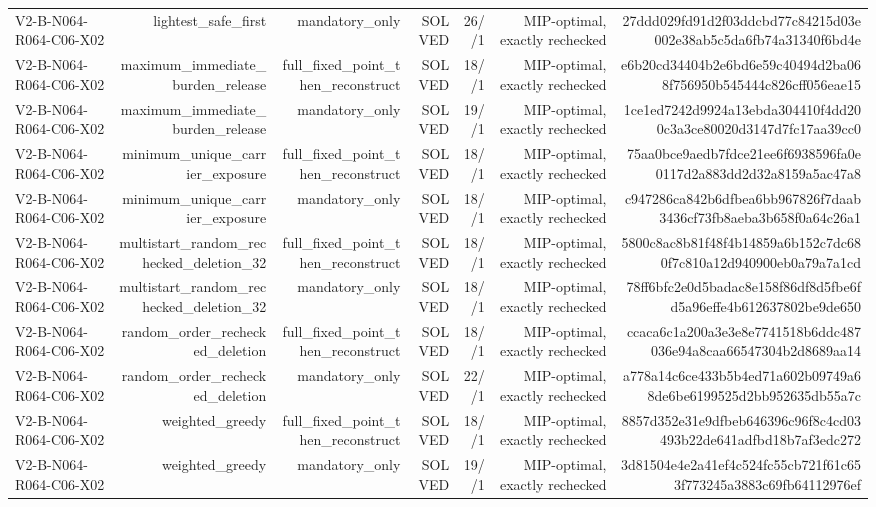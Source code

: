 {\begin{longtable}{lrrrrrr}
V2-B-N064-R064-C06-X02 & lightest\_safe\_first & mandatory\_only & SOLVED & 26//1 & MIP-optimal, exactly rechecked & 27ddd029fd91d2f03ddcbd77c84215d03e002e38ab5c5da6fb74a31340f6bd4e \\
V2-B-N064-R064-C06-X02 & maximum\_immediate\_burden\_release & full\_fixed\_point\_then\_reconstruct & SOLVED & 18//1 & MIP-optimal, exactly rechecked & e6b20cd34404b2e6bd6e59c40494d2ba068f756950b545444c826cff056eae15 \\
V2-B-N064-R064-C06-X02 & maximum\_immediate\_burden\_release & mandatory\_only & SOLVED & 19//1 & MIP-optimal, exactly rechecked & 1ce1ed7242d9924a13ebda304410f4dd200c3a3ce80020d3147d7fc17aa39cc0 \\
V2-B-N064-R064-C06-X02 & minimum\_unique\_carrier\_exposure & full\_fixed\_point\_then\_reconstruct & SOLVED & 18//1 & MIP-optimal, exactly rechecked & 75aa0bce9aedb7fdce21ee6f6938596fa0e0117d2a883dd2d32a8159a5ac47a8 \\
V2-B-N064-R064-C06-X02 & minimum\_unique\_carrier\_exposure & mandatory\_only & SOLVED & 18//1 & MIP-optimal, exactly rechecked & c947286ca842b6dfbea6bb967826f7daab3436cf73fb8aeba3b658f0a64c26a1 \\
V2-B-N064-R064-C06-X02 & multistart\_random\_rechecked\_deletion\_32 & full\_fixed\_point\_then\_reconstruct & SOLVED & 18//1 & MIP-optimal, exactly rechecked & 5800c8ac8b81f48f4b14859a6b152c7dc680f7c810a12d940900eb0a79a7a1cd \\
V2-B-N064-R064-C06-X02 & multistart\_random\_rechecked\_deletion\_32 & mandatory\_only & SOLVED & 18//1 & MIP-optimal, exactly rechecked & 78ff6bfc2e0d5badac8e158f86df8d5fbe6fd5a96effe4b612637802be9de650 \\
V2-B-N064-R064-C06-X02 & random\_order\_rechecked\_deletion & full\_fixed\_point\_then\_reconstruct & SOLVED & 18//1 & MIP-optimal, exactly rechecked & ccaca6c1a200a3e3e8e7741518b6ddc487036e94a8caa66547304b2d8689aa14 \\
V2-B-N064-R064-C06-X02 & random\_order\_rechecked\_deletion & mandatory\_only & SOLVED & 22//1 & MIP-optimal, exactly rechecked & a778a14c6ce433b5b4ed71a602b09749a68de6be6199525d2bb952635db55a7c \\
V2-B-N064-R064-C06-X02 & weighted\_greedy & full\_fixed\_point\_then\_reconstruct & SOLVED & 18//1 & MIP-optimal, exactly rechecked & 8857d352e31e9dfbeb646396c96f8c4cd03493b22de641adfbd18b7af3edc272 \\
V2-B-N064-R064-C06-X02 & weighted\_greedy & mandatory\_only & SOLVED & 19//1 & MIP-optimal, exactly rechecked & 3d81504e4e2a41ef4c524fc55cb721f61c653f773245a3883c69fb64112976ef \\

\end{longtable}}
